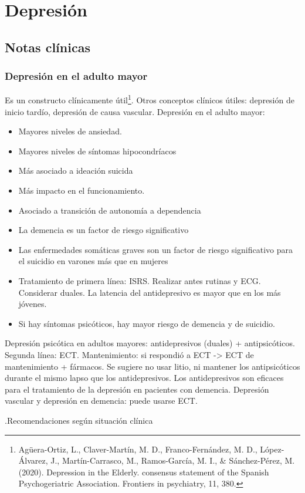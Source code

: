 \documentclass{scrbook}
\begin{document}
\chapter{Depresión}
\section*{Notas clínicas}
\subsection*{Depresión en el adulto mayor}
Es un constructo clínicamente útil\footnote{Agüera-Ortiz, L., Claver-Martín, M. D., Franco-Fernández, M. D., López-Álvarez, J., Martín-Carrasco, M., Ramos-García, M. I., \& Sánchez-Pérez, M. (2020). Depression in the Elderly. consensus statement of the Spanish Psychogeriatric Association. Frontiers in psychiatry, 11, 380.}.
Otros conceptos clínicos útiles: depresión de inicio tardío, depresión de causa vascular.
Depresión en el adulto mayor:
\begin{itemize}
 \item Mayores niveles de ansiedad.
 \item Mayores niveles de síntomas hipocondríacos
 \item Más asociado a ideación suicida
 \item Más impacto en el funcionamiento.
 \item Asociado a transición de autonomía a dependencia
 \item La demencia es un factor de riesgo significativo
 \item Las enfermedades somáticas graves son un factor de riesgo significativo para el suicidio en varones más que en mujeres
 \item Tratamiento de primera línea: ISRS. Realizar antes rutinas y ECG. Considerar duales. La latencia del antidepresivo es mayor que en los más jóvenes.
 \item Si hay síntomas psicóticos, hay mayor riesgo de demencia y de suicidio.
\end{itemize}
Depresión psicótica en adultos mayores: antidepresivos (duales) + antipsicóticos. Segunda línea: ECT. Mantenimiento: si respondió a ECT -> ECT de mantenimiento + fármacos. Se sugiere no usar litio, ni mantener los antipsicóticos durante el mismo lapso que los antidepresivos.
Los antidepresivos son eficaces para el tratamiento de la depresión en pacientes con demencia.
Depresión vascular y depresión en demencia: puede usarse ECT.

.Recomendaciones según situación clínica
\end{document}
